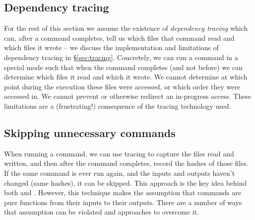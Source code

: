 \subsection{Dependency tracing}
\label{sec:assume_tracing}

For the rest of this section we assume the existence of \emph{dependency tracing} which can, after a command completes, tell us which files that command read and which files it wrote -- we discuss the implementation and limitations of dependency tracing in \S\ref{sec:tracing}. Concretely, we can run a command in a special mode such that when the command completes (and not before) we can determine which files it read and which it wrote. We cannot determine at which point during the execution these files were accessed, or which order they were accessed in. We cannot prevent or otherwise redirect an in-progress access. These limitations are a (frustrating!) consequence of the tracing technology used.

\subsection{Skipping unnecessary commands}
\label{sec:skipping_unnecessary}

When running a command, we can use tracing to capture the files read and written, and then after the command completes, record the hashes of those files. If the same command is ever run again, and the inputs and outputs haven't changed (same hashes), it can be skipped. This approach is the key idea behind both \Memoize\cite{memoize} and \Fabricate\cite{fabricate}. However, this technique makes the assumption that commands are pure functions from their inputs to their outputs. There are a number of ways that assumption can be violated and approaches to overcome it.

